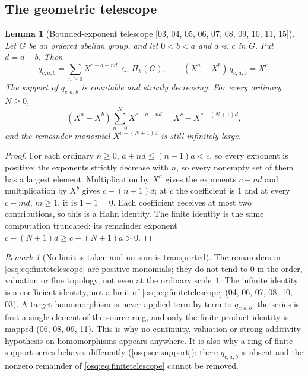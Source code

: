 \documentclass[11pt,letterpaper]{article}
\numberwithin{equation}{section}
\newtheorem{lemma}[lemma]{Lemma}
\theoremstyle{definition}
\theoremstyle{remark}
\newtheorem{remark}[remark]{Remark}
\theoremstyle{plain}
\newcommand{\src}[1]{\textup{\textsf{[#1]}}}
\begin{document}
\subsection{The geometric telescope}\label{osq:sub:telescope}

\begin{lemma}[Bounded-exponent telescope \src{03, 04, 05, 06, 07, 08, 09, 10, 11, 15}]\label{osq:lem:telescope}
Let $G$ be an ordered abelian group, and let $0<b<a$ and $a\ll c$ in $G$. Put $d=a-b$.
Then
\begin{equation}\label{osq:eq:telescope}
 q_{c;a,b}=\sum_{n\ge0}X^{c-a-nd}\ \in\ \Pi_k(G),
 \qquad (X^a-X^b)\,q_{c;a,b}=X^c .
\end{equation}
The support of $q_{c;a,b}$ is countable and strictly decreasing. For every ordinary
$N\ge0$,
\begin{equation}\label{osq:eq:finitetelescope}
 (X^a-X^b)\sum_{n=0}^{N}X^{c-a-nd}=X^c-X^{c-(N+1)d},
\end{equation}
and the remainder monomial $X^{c-(N+1)d}$ is still infinitely large.
\end{lemma}
\begin{proof}
For each ordinary $n\ge0$, $a+nd\le(n+1)a<c$, so every exponent is positive; the
exponents strictly decrease with $n$, so every nonempty set of them has a largest element.
Multiplication by $X^a$ gives the exponents $c-nd$ and multiplication by $X^b$ gives
$c-(n+1)d$; at $c$ the coefficient is $1$ and at every $c-md$, $m\ge1$, it is $1-1=0$.
Each coefficient receives at most two contributions, so this is a Hahn identity. The finite
identity is the same computation truncated; its remainder exponent
$c-(N+1)d\ge c-(N+1)a>0$.
\end{proof}

\begin{remark}[No limit is taken and no sum is transported]\label{osq:rem:nolimit}
The remainders in \eqref{osq:eq:finitetelescope} are positive monomials; they do not tend
to $0$ in the order, valuation or fine topology, not even at the ordinary scale~$1$. The
infinite identity is a coefficient identity, not a limit of \eqref{osq:eq:finitetelescope}
(04, 06, 07, 08, 10, 03). A target homomorphism is never applied term by term to
$q_{c;a,b}$: the series is first a single element of the source ring, and only the finite
product identity is mapped (06, 08, 09, 11). This is why no continuity, valuation or
strong-additivity hypothesis on homomorphisms appears anywhere. It is also why a ring of
finite-support series behaves differently (\cref{osq:sec:support}): there
$q_{c;a,b}$ is absent and the nonzero remainder of \eqref{osq:eq:finitetelescope} cannot
be removed.
\end{remark}
\end{document}
